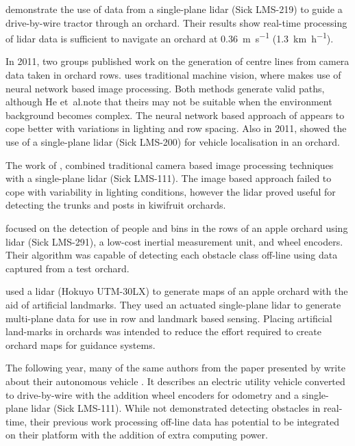\documentclass[preprint,authoryear,12pt]{elsarticle}
\begin{document}
        \cite{Barawid2007} demonstrate the use of data from a single-plane lidar (Sick LMS-219) to guide a drive-by-wire tractor through an orchard.
        Their results show real-time processing of lidar data is sufficient to navigate an orchard at \SI{0.36}{\meter\per\second} (\SI{1.3}{\kilo\meter\per\hour}).


        In 2011, two groups published work on the generation of centre lines from camera data taken in orchard rows.
        \cite{He2011} uses traditional machine vision, where \cite{Torres2011} makes use of neural network based image processing.
        Both methods generate valid paths, although He et~al.\@ note that theirs may not be suitable when the environment background becomes complex.
        The neural network based approach of \cite{Torres2011} appears to cope better with variations in lighting and row spacing.
        Also in 2011, \cite{Hansen2011} showed the use of a single-plane lidar (Sick LMS-200) for vehicle localisation in an orchard.

        The work of \cite{Scarfe2012}, combined traditional camera based image processing techniques with a single-plane lidar (Sick LMS-111).
        The image based approach failed to cope with variability in lighting conditions, however the lidar proved useful for detecting the trunks and posts in kiwifruit orchards.

        \cite{Freitas2012} focused on the detection of people and bins in the rows of an apple orchard using lidar (Sick LMS-291), a low-cost inertial measurement unit, and wheel encoders.
        Their algorithm was capable of detecting each obstacle class off-line using data captured from a test orchard.

        \cite{Zhang2014} used a lidar (Hokuyo UTM-30LX) to generate maps of an apple orchard with the aid of artificial landmarks.
        They used an actuated single-plane lidar to generate multi-plane data for use in row and landmark based sensing.
        Placing artificial land-marks in orchards was intended to reduce the effort required to create orchard maps for guidance systems.

        The following year, many of the same authors from  the paper presented by \cite{Zhang2014} write about their autonomous vehicle \citep{Bergerman2015}.
        It describes an electric utility vehicle converted to drive-by-wire with the addition wheel encoders for odometry and a single-plane lidar (Sick LMS-111).
        While not demonstrated detecting obstacles in real-time, their previous work processing off-line data \citep{Freitas2012} has potential to be integrated on their platform with the addition of extra computing power.
\end{document}
